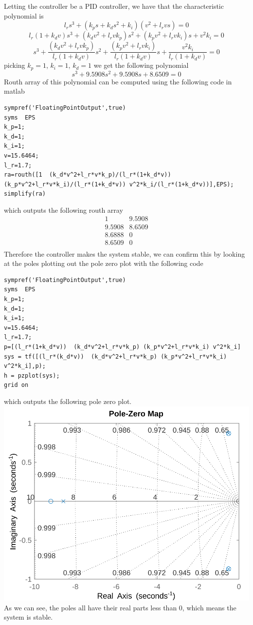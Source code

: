\documentclass[12pt]{article}
\begin{document}
Letting the controller be a PID controller, we have that the characteristic polynomial is
$$l_r s^3+(k_ps+k_ds^2+k_i)(v^2+l_r v s)=0$$
$$l_r(1+k_d v)s^3+(k_dv^2+l_r v k_p)s^2+(k_pv^2+l_r v k_i)s+v^2k_i=0$$
$$s^3+\frac{(k_dv^2+l_r v k_p)}{l_r(1+k_d v)}s^2+\frac{(k_pv^2+l_r v k_i)}{l_r(1+k_d v)}s+\frac{v^2k_i}{l_r(1+k_d v)}=0$$
picking $k_p=1$, $k_i=1$, $k_d=1$ we get the following polynomial
$$s^3+9.5908s^2+9.5908s+8.6509=0$$
Routh array of this polynomial can be computed using the following code in matlab
\begin{verbatim}
sympref('FloatingPointOutput',true)
syms  EPS
k_p=1;
k_d=1;
k_i=1; 
v=15.6464;
l_r=1.7;
ra=routh([1  (k_d*v^2+l_r*v*k_p)/(l_r*(1+k_d*v)) (k_p*v^2+l_r*v*k_i)/(l_r*(1+k_d*v)) v^2*k_i/(l_r*(1+k_d*v))],EPS);
simplify(ra)
\end{verbatim}
which outputs the following routh array
$$\begin{matrix}
    1 & 9.5908\\
    9.5908& 8.6509\\
8.6888&      0\\
8.6509&      0\\
\end{matrix}$$
Therefore the controller makes the system stable, we can confirm this by looking at the poles
plotting out the pole zero plot with the following code 
\begin{verbatim}
sympref('FloatingPointOutput',true)
syms  EPS
k_p=1;
k_d=1;
k_i=1; 
v=15.6464;
l_r=1.7;
p=[(l_r*(1+k_d*v))  (k_d*v^2+l_r*v*k_p) (k_p*v^2+l_r*v*k_i) v^2*k_i]
sys = tf([(l_r*(k_d*v))  (k_d*v^2+l_r*v*k_p) (k_p*v^2+l_r*v*k_i) v^2*k_i],p);
h = pzplot(sys);
grid on
\end{verbatim}
which outputs the following pole zero plot.\\
\includegraphics[scale=0.4]{Problem2Fig1.png}\\
As we can see, the poles all have their real parts less than 0, which means the system is stable.
\end{document}
